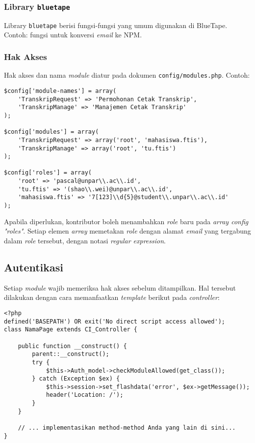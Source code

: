 	\subsubsection{Library \texttt{bluetape}}
		Library \texttt{bluetape} berisi fungsi-fungsi yang umum digunakan di BlueTape. Contoh: fungsi untuk konversi \textit{email} ke NPM.
	
	\subsubsection{Hak Akses}
		Hak akses dan nama \textit{module} diatur pada dokumen \texttt{config/modules.php}. Contoh:
\begin{lstlisting}
$config['module-names'] = array(
    'TranskripRequest' => 'Permohonan Cetak Transkrip',
    'TranskripManage' => 'Manajemen Cetak Transkrip'
);

$config['modules'] = array(
    'TranskripRequest' => array('root', 'mahasiswa.ftis'),
    'TranskripManage' => array('root', 'tu.ftis')
);

$config['roles'] = array(
    'root' => 'pascal@unpar\\.ac\\.id',
    'tu.ftis' => '(shao\\.wei)@unpar\\.ac\\.id',
    'mahasiswa.ftis' => '7[123]\\d{5}@student\\.unpar\\.ac\\.id'
);
\end{lstlisting}
	
		Apabila diperlukan, kontributor boleh menambahkan \textit{role} baru pada \textit{array config "roles"}. Setiap elemen \textit{array} memetakan \textit{role} dengan alamat \textit{email} yang tergabung dalam \textit{role} tersebut, dengan notasi \textit{regular expression}.

\subsection{Autentikasi}
	Setiap \textit{module} wajib memeriksa hak akses sebelum ditampilkan. Hal tersebut dilakukan dengan cara memanfaatkan \textit{template} berikut pada \textit{controller}:
\begin{lstlisting}
<?php
defined('BASEPATH') OR exit('No direct script access allowed');
class NamaPage extends CI_Controller {

    public function __construct() {
        parent::__construct();
        try {
            $this->Auth_model->checkModuleAllowed(get_class());
        } catch (Exception $ex) {
            $this->session->set_flashdata('error', $ex->getMessage());
            header('Location: /');
        }
    }

    // ... implementasikan method-method Anda yang lain di sini...
}
\end{lstlisting}

